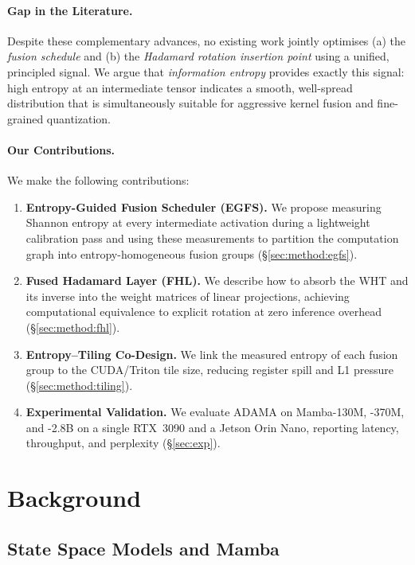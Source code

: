 \documentclass{article}
\begin{document}
\paragraph{Gap in the Literature.}
Despite these complementary advances, no existing work jointly optimises
(a) the \emph{fusion schedule} and (b) the \emph{Hadamard rotation insertion
point} using a unified, principled signal.  We argue that \emph{information
entropy} provides exactly this signal: high entropy at an intermediate tensor
indicates a smooth, well-spread distribution that is simultaneously suitable
for aggressive kernel fusion and fine-grained quantization.

\paragraph{Our Contributions.}
We make the following contributions:
\begin{enumerate}
  \item \textbf{Entropy-Guided Fusion Scheduler (EGFS).}  We propose measuring
        Shannon entropy at every intermediate activation during a lightweight
        calibration pass and using these measurements to partition the
        computation graph into entropy-homogeneous fusion groups
        (\S\ref{sec:method:egfs}).
  \item \textbf{Fused Hadamard Layer (FHL).}  We describe how to absorb the
        WHT and its inverse into the weight matrices of linear projections,
        achieving computational equivalence to explicit rotation at zero
        inference overhead (\S\ref{sec:method:fhl}).
  \item \textbf{Entropy–Tiling Co-Design.}  We link the measured entropy of
        each fusion group to the CUDA/Triton tile size, reducing register spill
        and L1 pressure (\S\ref{sec:method:tiling}).
  \item \textbf{Experimental Validation.}  We evaluate ADAMA on Mamba-130M,
        -370M, and -2.8B on a single RTX~3090 and a Jetson Orin Nano,
        reporting latency, throughput, and perplexity (\S\ref{sec:exp}).
\end{enumerate}

\section{Background}
\label{sec:background}

\subsection{State Space Models and Mamba}
\label{sec:background:ssm}
\end{document}
